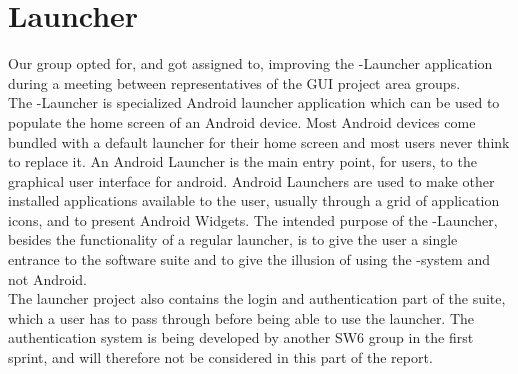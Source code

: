 
\section{Launcher}

Our group opted for, and got assigned to, improving the \giraf-Launcher application during a meeting between representatives of the GUI project area groups.\\

The \giraf-Launcher is specialized Android launcher application which can be used to populate the home screen of an Android device. Most Android devices come bundled with a default launcher for their home screen and most users never think to replace it. An Android Launcher is the main entry point, for users, to the graphical user interface for android. Android Launchers are used to make other installed applications available to the user, usually through a grid of application icons, and to present Android Widgets. The intended purpose of the \giraf-Launcher, besides the functionality of a regular launcher, is to give the user a single entrance to the \giraf software suite and to give the illusion of using the \giraf-system and not Android.\\

The launcher project also contains the login and authentication part of the \giraf suite, which a user has to pass through before being able to use the launcher. The authentication system is being developed by another SW6 group in the first sprint, and will therefore not be considered in this part of the report. 
